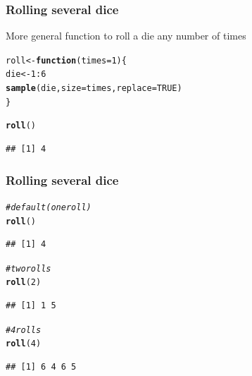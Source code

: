 \documentclass[12pt]{beamer}\usepackage[]{graphicx}\usepackage[]{color}
\makeatletter
\newcommand{\hlnum}[1]{\textcolor[rgb]{0.686,0.059,0.569}{#1}}%
\newcommand{\hlcom}[1]{\textcolor[rgb]{0.678,0.584,0.686}{\textit{#1}}}%
\newcommand{\hlopt}[1]{\textcolor[rgb]{0,0,0}{#1}}%
\newcommand{\hlstd}[1]{\textcolor[rgb]{0.345,0.345,0.345}{#1}}%
\newcommand{\hlkwa}[1]{\textcolor[rgb]{0.161,0.373,0.58}{\textbf{#1}}}%
\newcommand{\hlkwb}[1]{\textcolor[rgb]{0.69,0.353,0.396}{#1}}%
\newcommand{\hlkwc}[1]{\textcolor[rgb]{0.333,0.667,0.333}{#1}}%
\newcommand{\hlkwd}[1]{\textcolor[rgb]{0.737,0.353,0.396}{\textbf{#1}}}%
\newenvironment{kframe}{%
 \def\at@end@of@kframe{}%
 \ifinner\ifhmode%
  \def\at@end@of@kframe{\end{minipage}}%
  \begin{minipage}{\columnwidth}%
 \fi\fi%
 \def\FrameCommand##1{\hskip\@totalleftmargin \hskip-\fboxsep
 \colorbox{shadecolor}{##1}\hskip-\fboxsep
     \hskip-\linewidth \hskip-\@totalleftmargin \hskip\columnwidth}%
 \MakeFramed {\advance\hsize-\width
   \@totalleftmargin\z@ \linewidth\hsize
   \@setminipage}}%
 {\par\unskip\endMakeFramed%
 \at@end@of@kframe}
\newenvironment{knitrout}{}{} %
\makeatother
\begin{document}
\begin{frame}[fragile]
\frametitle{Rolling several dice}

More general function to roll a die any number of times
\begin{knitrout}\footnotesize
{}\color{fgcolor}\begin{kframe}
\begin{alltt}
\hlstd{roll} \hlkwb{<-} \hlkwa{function}\hlstd{(}\hlkwc{times} \hlstd{=} \hlnum{1}\hlstd{) \{}
  \hlstd{die} \hlkwb{<-} \hlnum{1}\hlopt{:}\hlnum{6}
  \hlkwd{sample}\hlstd{(die,} \hlkwc{size} \hlstd{= times,} \hlkwc{replace} \hlstd{=} \hlnum{TRUE}\hlstd{)}
\hlstd{\}}
\end{alltt}
\end{kframe}
\end{knitrout}

\pause
\begin{knitrout}\footnotesize
{}\color{fgcolor}\begin{kframe}
\begin{alltt}
\hlkwd{roll}\hlstd{()}
\end{alltt}
\begin{verbatim}
## [1] 4
\end{verbatim}
\end{kframe}
\end{knitrout}
\end{frame}


\begin{frame}[fragile]
\frametitle{Rolling several dice}

\begin{knitrout}\footnotesize
{}\color{fgcolor}\begin{kframe}
\begin{alltt}
\hlcom{# default (one roll)}
\hlkwd{roll}\hlstd{()}
\end{alltt}
\begin{verbatim}
## [1] 4
\end{verbatim}
\begin{alltt}
\hlcom{# two rolls}
\hlkwd{roll}\hlstd{(}\hlnum{2}\hlstd{)}
\end{alltt}
\begin{verbatim}
## [1] 1 5
\end{verbatim}
\begin{alltt}
\hlcom{# 4 rolls }
\hlkwd{roll}\hlstd{(}\hlnum{4}\hlstd{)}
\end{alltt}
\begin{verbatim}
## [1] 6 4 6 5
\end{verbatim}
\end{kframe}
\end{knitrout}
\end{frame}
\end{document}
